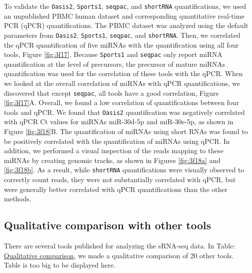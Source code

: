 \documentclass[12pt,twoside]{reedthesis}
\begin{document}
To validate the \texttt{Oasis2}, \texttt{Sports1}, \texttt{seqpac}, and \texttt{shortRNA} quantifications,
we used an unpublished PBMC human dataset and corresponding quantitative
real-time PCR (qPCR) quantifications. The PBMC dataset was analyzed
using the default parameters from \texttt{Oasis2}, \texttt{Sports1}, \texttt{seqpac}, and \texttt{shortRNA}.
Then, we correlated the qPCR quantification of five miRNAs with the
quantification using all four tools, Figure \ref{fig:3f17}. Because \texttt{Sports1} and
\texttt{seqpac} only report miRNA quantification at the level of precursors, the
precursor of mature miRNAs quantification was used for the correlation
of these tools with the qPCR. When we looked at the overall correlation
of miRNAs with qPCR quantifications, we discovered that except \texttt{seqpac}, all tools have a good correlation, Figure \ref{fig:3f17}A. Overall, we found a low correlation of
quantifications between four tools and qPCR. We found that \texttt{Oasis2}
quantification was negatively correlated with qPCR Ct values for miRNAs
miR-30d-5p and miR-30e-5p, as shown in Figure \ref{fig:3f18}B. The quantification of
miRNAs using short RNAs was found to be positively correlated with the
quantification of miRNAs using qPCR. In addition, we performed a visual
inspection of the reads mapping to these miRNAs by creating genomic
tracks, as shown in Figures \ref{fig:3f18a} and \ref{fig:3f18b}. As a result, while \texttt{shortRNA}
quantifications were visually observed to correctly count reads, they
were not substantially correlated with qPCR, but were generally better
correlated with qPCR quantifications than the other methods.


\begin{subfigures}







\end{subfigures}
\hypertarget{qualitative-comparison-with-other-tools}{%
\subsection{Qualitative comparison with other tools}\label{qualitative-comparison-with-other-tools}}

There are several tools published for analyzing the sRNA-seq data. In
Table: \href{figures/shortRNA/in/t3.xlsx}{Qualitative comparison}, we made a qualitative comparison of 20 other tools. Table is too big to be displayed here.
\end{document}
